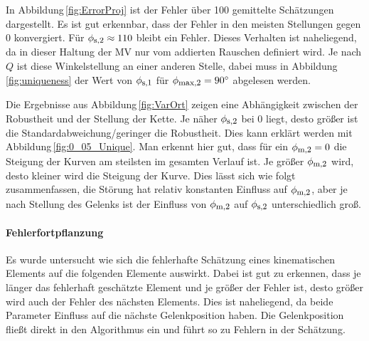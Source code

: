 In Abbildung\,\ref{fig:ErrorProj} ist der Fehler über 100 gemittelte Schätzungen dargestellt. Es ist gut erkennbar, dass der Fehler in den meisten Stellungen gegen 0 konvergiert. Für $\phi_{\textrm{\footnotesize{s,2}}}\approx 110$ bleibt ein Fehler. Dieses Verhalten ist naheliegend, da in dieser Haltung der MV nur vom addierten Rauschen definiert wird. Je nach $Q$ ist diese Winkelstellung an einer anderen Stelle, dabei muss in Abbildung\,\ref{fig:uniqueness} der Wert von $\phi_{\textrm{\footnotesize{s,1}}}$ für $\phi_{\textrm{\footnotesize{max,2}}}=90^\circ$ abgelesen werden.

Die Ergebnisse aus Abbildung\,\ref{fig:VarOrt} zeigen eine Abhängigkeit zwischen der Robustheit und der Stellung der Kette. Je näher $\phi_{\textrm{\footnotesize{s,2}}}$ bei 0 liegt, desto größer ist die Standardabweichung/geringer die Robustheit. Dies kann erklärt werden mit Abbildung\,\ref{fig:0_05_Unique}. Man erkennt hier gut, dass für ein $\phi_{\textrm{\footnotesize{m,2}}} = 0$ die Steigung der Kurven am steilsten im gesamten Verlauf ist. Je größer $\phi_{\textrm{\footnotesize{m,2}}}$ wird, desto kleiner wird die Steigung der Kurve. Dies lässt sich wie folgt zusammenfassen, die Störung hat relativ konstanten Einfluss auf $\phi_{\textrm{\footnotesize{m,2}}}$, aber je nach Stellung des Gelenks ist der Einfluss von $\phi_{\textrm{\footnotesize{m,2}}}$ auf $\phi_{\textrm{\footnotesize{s,2}}}$ unterschiedlich groß.

\paragraph{Fehlerfortpflanzung}
Es wurde untersucht wie sich die fehlerhafte Schätzung eines kinematischen Elements auf die folgenden Elemente auswirkt. Dabei ist gut zu erkennen, dass je länger das fehlerhaft geschätzte Element und je größer der Fehler ist, desto größer wird auch der Fehler des nächsten Elements. Dies ist naheliegend, da beide Parameter Einfluss auf die nächste Gelenkposition haben. Die Gelenkposition fließt direkt in den Algorithmus ein und führt so zu Fehlern in der Schätzung.

 
